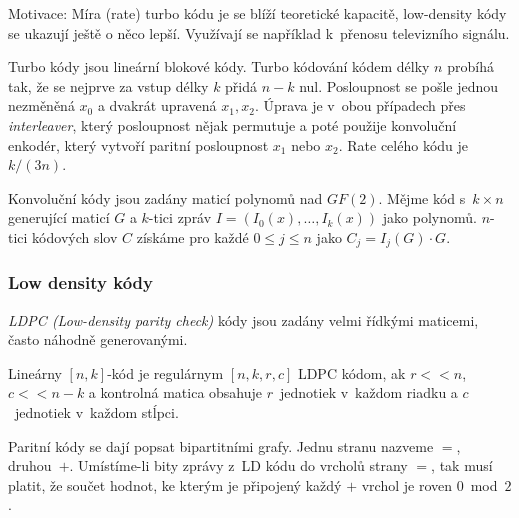 Motivace: Míra (rate) turbo kódu je se blíží teoretické kapacitě,
low-density kódy se ukazují ještě o něco lepší. Využívají se například
k~přenosu televizního signálu.

Turbo kódy jsou lineární blokové kódy.
Turbo kódování kódem délky $n$ probíhá tak, že se nejprve za vstup délky $k$ přidá $n -
k$ nul. Posloupnost se pošle jednou nezměněná $x_0$ a dvakrát upravená
$x_1, x_2$. Úprava
je v~obou případech přes {\em interleaver}, který posloupnost nějak
permutuje a poté použije konvoluční enkodér, který vytvoří paritní
posloupnost $x_1$ nebo $x_2$. Rate celého kódu je $k/(3n)$.

Konvoluční kódy jsou zadány maticí polynomů nad $GF(2)$. Mějme kód
s~$k\times n$ generující maticí $G$ a $k$-tici zpráv
$I = (I_0(x),\ldots,I_k(x))$ jako polynomů. $n$-tici kódových slov
$C$ získáme pro každé $0 \leq j \leq n$ jako $C_j = I_j(G) \cdot G$.

\subsubsection{Low density kódy}


{\em LDPC (Low-density parity check)} kódy jsou zadány velmi řídkými maticemi, často náhodně
generovanými. 

Lineárny $[n,k]$-kód je regulárnym $[n,k,r,c]$ LDPC kódom, ak $r << n$,
$c << n-k$ a kontrolná matica obsahuje $r$~jednotiek v~každom riadku
a $c$~jednotiek v~každom stĺpci.

Paritní kódy se dají popsat bipartitními grafy.
Jednu stranu nazveme $=$, druhou~$+$. Umístíme-li bity zprávy z~LD kódu
do vrcholů strany $=$, tak musí platit, že součet hodnot, ke kterým je
připojený každý $+$ vrchol je roven $0$~mod~$2$.

